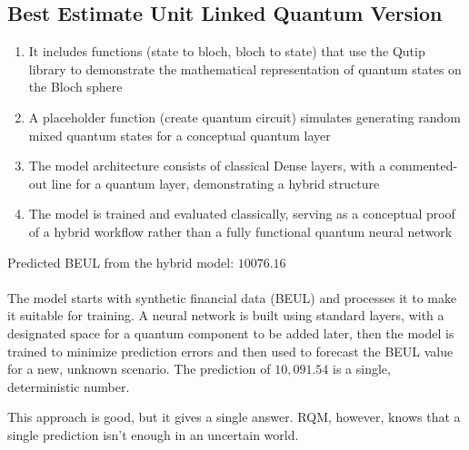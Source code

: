 \documentclass{article}
\begin{document}
\subsection{Best Estimate Unit Linked Quantum Version}
\begin{enumerate}
    \item It includes functions (state to bloch, bloch to state) that use the Qutip library to demonstrate the mathematical representation of quantum states on the Bloch sphere
    \item A placeholder function (create quantum circuit) simulates generating random mixed quantum states for a conceptual quantum layer
    \item The model architecture consists of classical Dense layers, with a commented-out line for a quantum layer, demonstrating a hybrid structure
    \item The model is trained and evaluated classically, serving as a conceptual proof of a hybrid workflow rather than a fully functional quantum neural network
\end{enumerate}
Predicted BEUL from the hybrid model: $10076.16$\\\\
The model starts with synthetic financial data (BEUL) and processes it to make it suitable for training. A neural network is built using standard layers, with a designated space for a quantum component to be added later, then the model is trained to minimize prediction errors and then used to forecast the BEUL value for a new, unknown scenario. The prediction of $10,091.54$ is a single, deterministic number.


This approach is good, but it gives a single answer. RQM, however, knows that a single prediction isn't enough in an uncertain world.
\end{document}

